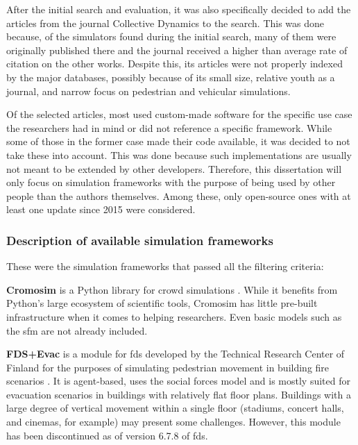 \documentclass[twoside, 11pt]{article}
\begin{document}
After the initial search and evaluation, it was also specifically decided to add the articles from the journal Collective Dynamics to the search. This was done because, of the simulators found during the initial search, many of them were originally published there and the journal received a higher than average rate of citation on the other works. Despite this, its articles were not properly indexed by the major databases, possibly because of its small size, relative youth as a journal, and narrow focus on pedestrian and vehicular simulations. 

Of the selected articles, most used custom-made software for the specific use case the researchers had in mind or did not reference a specific framework. While some of those in the former case made their code available, it was decided to not take these into account. This was done because such implementations are usually not meant to be extended by other developers. Therefore, this dissertation will only focus on simulation frameworks with the purpose of being used by other people than the authors themselves. Among these, only open-source ones with at least one update since 2015 were considered. 

\subsubsection{Description of available simulation frameworks} \label{sec:frameworks}

These were the simulation frameworks that passed all the filtering criteria:

\textbf{Cromosim} is a Python library for crowd simulations \cite{cromosim}. While it benefits from Python's large ecosystem of scientific tools, Cromosim has little pre-built infrastructure when it comes to helping researchers. Even basic models such as the \gls{sfm} are not already included.

\textbf{FDS+Evac} is a module for \gls{fds} developed by the Technical Research Center of Finland for the purposes of simulating pedestrian movement in building fire scenarios \cite{korhonenFireDynamicsSimulator2009}. It is agent-based, uses the social forces model and is mostly suited for evacuation scenarios in buildings with relatively flat floor plans. Buildings with a large degree of vertical movement within a single floor (stadiums, concert halls, and cinemas, for example) may present some challenges. However, this module has been discontinued as of version 6.7.8 of \gls{fds}.
\end{document}
